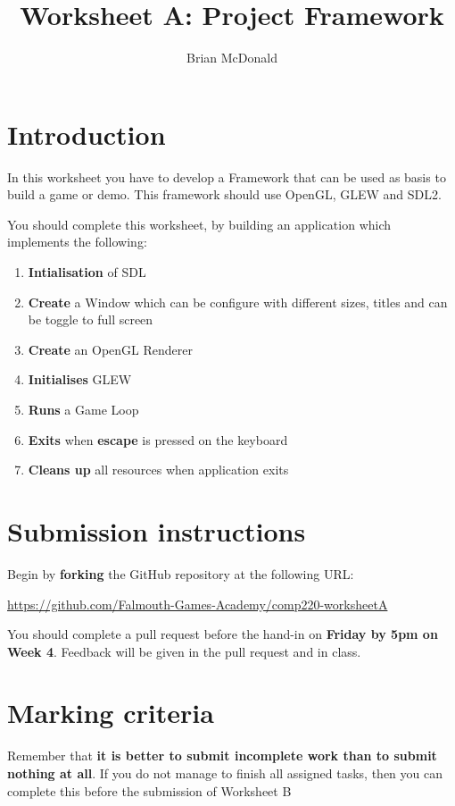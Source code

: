 \documentclass{../../../fal_assignment}
\title{Worksheet A: Project Framework}
\author{Brian McDonald}
\begin{document}
\maketitle

\section*{Introduction}

In this worksheet you have to develop a Framework that can be used as basis to build a game or demo. This framework should use OpenGL, GLEW and SDL2.

You should complete this worksheet, by building an application which implements the following:
\begin{enumerate}[label=(\alph*)]
	\item \textbf{Intialisation} of SDL
	\item \textbf{Create} a Window which can be configure with different sizes, titles and can be toggle to full screen
	\item \textbf{Create} an OpenGL Renderer
	\item \textbf{Initialises} GLEW
	\item \textbf{Runs} a Game Loop
	\item \textbf{Exits} when \textbf{escape} is pressed on the keyboard 
	\item \textbf{Cleans up} all resources when application exits
\end{enumerate}

\section*{Submission instructions}

Begin by \textbf{forking} the GitHub repository at the following URL:

\url{https://github.com/Falmouth-Games-Academy/comp220-worksheetA}

You should complete a pull request before the hand-in on \textbf{Friday by 5pm on Week 4}. Feedback will be given in the pull request and in class.

\section*{Marking criteria}

Remember that \textbf{it is better to submit incomplete work than to submit nothing at all}. If you do not manage to finish all assigned tasks, then you can complete this before the submission of Worksheet B
\end{document}
